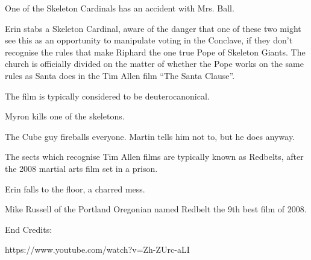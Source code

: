 One of the Skeleton Cardinals has an accident with Mrs. Ball.\medskip

Erin stabs a Skeleton Cardinal, aware of the danger that one of these two might see this as an opportunity to manipulate voting in the Conclave, if they don’t recognise the rules that make Riphard the one true Pope of Skeleton Giants. The church is officially divided on the matter of whether the Pope works on the same rules as Santa does in the Tim Allen film “The Santa Clause”.\medskip

The film is typically considered to be deuterocanonical.\medskip

Myron kills one of the skeletons.\medskip

The Cube guy fireballs everyone. Martin tells him not to, but he does anyway.\medskip

The sects which recognise Tim Allen films are typically known as Redbelts, after the 2008 martial arts film set in a prison.\medskip

Erin falls to the floor, a charred mess.\medskip

Mike Russell of the Portland Oregonian named Redbelt the 9th best film of 2008.\medskip

End Credits:\medskip

https://www.youtube.com/watch?v=Zh-ZUrc-aLI\medskip

\vspace*{5mm}

